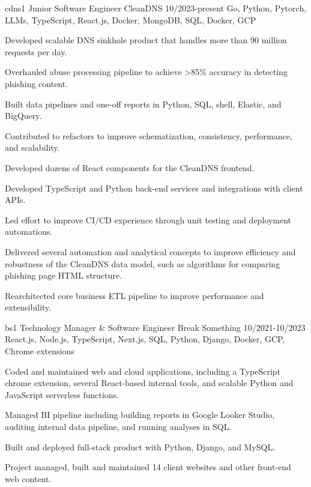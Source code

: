 \documentclass[letterpaper,10pt]{article}
\begin{document}
\jobentry
    {cdns1}
    {Junior Software Engineer}
    {CleanDNS}
    {10/2023-present}
    {Go, Python, Pytorch, LLMs, TypeScript, React.js, Docker, MongoDB, SQL, Docker, GCP}
    {
        \item Developed scalable DNS sinkhole product that handles more than 90 million requests per day.
        \item Overhauled abuse processing pipeline to achieve >85\% accuracy in detecting phishing content.
        \item Built data pipelines and one-off reports in Python, SQL, shell, Elastic, and BigQuery.
        \item Contributed to refactors to improve schematization, consistency, performance, and scalability.
        \item Developed dozens of React components for the CleanDNS frontend.
        \item Developed TypeScript and Python back-end services and integrations with client APIs.
        \item Led effort to improve CI/CD experience through unit testing and deployment automations.
        \item Delivered several automation and analytical concepts to improve efficiency and robustness of the CleanDNS data model, such as algorithms for comparing phishing page HTML structure.
        \item Rearchitected core business ETL pipeline to improve performance and extensibility.
    }

\jobentry
    {bs1}
    {Technology Manager \& Software Engineer}
    {Break Something}
    {10/2021-10/2023}
    {React.js, Node.js, TypeScript, Next.js, SQL, Python, Django, Docker, GCP, Chrome extensions}
    {
        \item Coded and maintained web and cloud applications, including a TypeScript chrome extension, several React-based internal tools, and scalable Python and JavaScript serverless functions.
        \item Managed BI pipeline including building reports in Google Looker Studio, auditing internal data pipeline, and running analyses in SQL.
        \item Built and deployed full-stack product with Python, Django, and MySQL.
        \item Project managed, built and maintained 14 client websites and other front-end web content.
    }
\end{document}
